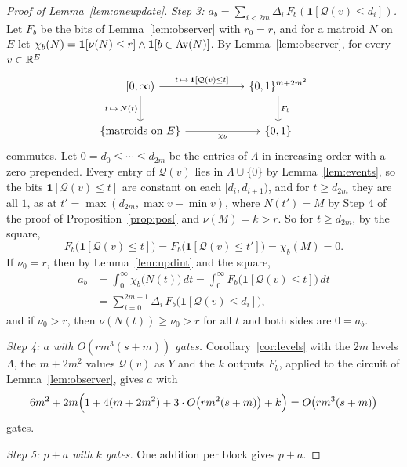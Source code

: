 \begin{proof}[Proof of Lemma~\ref{lem:oneupdate}]
\emph{Step 3: $a_b=\sum_{i<2m}\Delta_i\,F_b(\mathbf 1[\mathcal Q(v)\le d_i])$.}  Let $F_b$ be the bits of
Lemma~\ref{lem:observer} with $r_0=r$, and for a matroid $N$ on $E$ let
$\chi_b(N)=\mathbf 1[\nu(N)\le r]\wedge\mathbf 1[b\in\operatorname{Av}(N)]$.  By
Lemma~\ref{lem:observer}, for every $v\in\mathbb R^{E}$
\[
  \begin{tikzcd}[column sep=5.4em,row sep=2.4em]
    {[0,\infty)}\arrow[r,"{t\,\mapsto\,\mathbf 1[\mathcal Q(v)\le t]}"]
      \arrow[d,"{t\,\mapsto\,N(t)}"'] &
    \{0,1\}^{m+2m^{2}}\arrow[d,"F_b"]\\
    \{\text{matroids on }E\}\arrow[r,"\chi_b"'] & \{0,1\}
  \end{tikzcd}
\]
commutes.  Let $0=d_0\le\cdots\le d_{2m}$ be the entries of
$\Lambda$ in increasing order with a zero prepended.  Every entry of $\mathcal Q(v)$
lies in $\Lambda\cup\{0\}$ by Lemma~\ref{lem:events}, so the bits
$\mathbf 1[\mathcal Q(v)\le t]$ are constant on each $[d_i,d_{i+1})$, and for
$t\ge d_{2m}$ they are all $1$, as at $t'=\max(d_{2m},\max v-\min v)$, where
$N(t')=M$ by Step 4 of the proof of Proposition~\ref{prop:posl} and $\nu(M)=k>r$.
So for $t\ge d_{2m}$, by the square,
\[
  F_b\bigl(\mathbf 1[\mathcal Q(v)\le t]\bigr)=F_b\bigl(\mathbf 1[\mathcal Q(v)\le t']\bigr)
  =\chi_b(M)=0.
\]
If $\nu_0=r$, then by Lemma~\ref{lem:updint} and the square,
\[
  \begin{aligned}
  a_b&=\int_0^{\infty}\chi_b\bigl(N(t)\bigr)\,dt
  =\int_0^{\infty}F_b\bigl(\mathbf 1[\mathcal Q(v)\le t]\bigr)\,dt\\
  &=\sum_{i=0}^{2m-1}\Delta_i\,F_b\bigl(\mathbf 1[\mathcal Q(v)\le d_i]\bigr),
  \end{aligned}
\]
and if $\nu_0>r$, then $\nu(N(t))\ge\nu_0>r$ for all $t$ and both sides are
$0=a_b$.

\emph{Step 4: $a$ with $O(rm^{3}(s+m))$ gates.}  Corollary~\ref{cor:levels} with the $2m$
levels $\Lambda$, the $m+2m^{2}$ values $\mathcal Q(v)$ as $Y$ and the $k$ outputs
$F_b$, applied to the circuit of Lemma~\ref{lem:observer}, gives $a$ with
\[
  6m^{2}+2m\Bigl(1+4(m+2m^{2})+3\cdot O\bigl(rm^{2}(s+m)\bigr)+k\Bigr)
  =O\bigl(rm^{3}(s+m)\bigr)
\]
gates.

\emph{Step 5: $p+a$ with $k$ gates.}  One addition per block gives $p+a$.
\end{proof}

